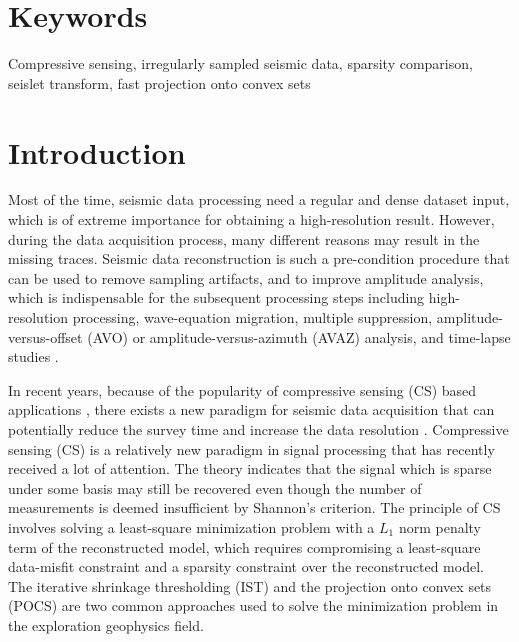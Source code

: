 \newpage
\section{Keywords}
Compressive sensing, irregularly sampled seismic data, sparsity comparison, seislet transform, fast projection onto convex sets

\section{Introduction}

Most of the time, seismic data processing need a regular and dense dataset input, which is of extreme importance for obtaining a high-resolution result.  However, during the data acquisition process, many different reasons may result in the missing traces. Seismic data reconstruction is such a pre-condition procedure that can be used to remove sampling artifacts, and to improve amplitude analysis, which is indispensable for the subsequent processing steps including high-resolution processing, wave-equation migration, multiple suppression, amplitude-versus-offset (AVO) or amplitude-versus-azimuth (AVAZ) analysis, and time-lapse studies \cite[]{daniel2002,liubin2004,abma2005,abma2006,juefu2010,mostafa2010,yangkang2014halfthr,yangkang2015eage2}. 

In recent years, because of the popularity of compressive sensing (CS) based applications \cite[]{candes20062}, there exists a new paradigm for seismic data acquisition that can potentially reduce the survey time and increase the data resolution \cite[]{herrmann2010}. Compressive sensing (CS) is a relatively new paradigm in signal processing that has recently received a lot of attention. The theory indicates that the signal which is sparse under some basis may still be recovered even though the number of measurements is deemed insufficient by Shannon's criterion. The principle of CS involves solving a least-square minimization problem with a $L_1$ norm penalty term of the reconstructed model, which requires compromising a least-square data-misfit constraint and a sparsity constraint over the reconstructed model. The iterative shrinkage thresholding (IST) and the projection onto convex sets (POCS) are two common approaches used to solve the minimization problem in the exploration geophysics field. 

